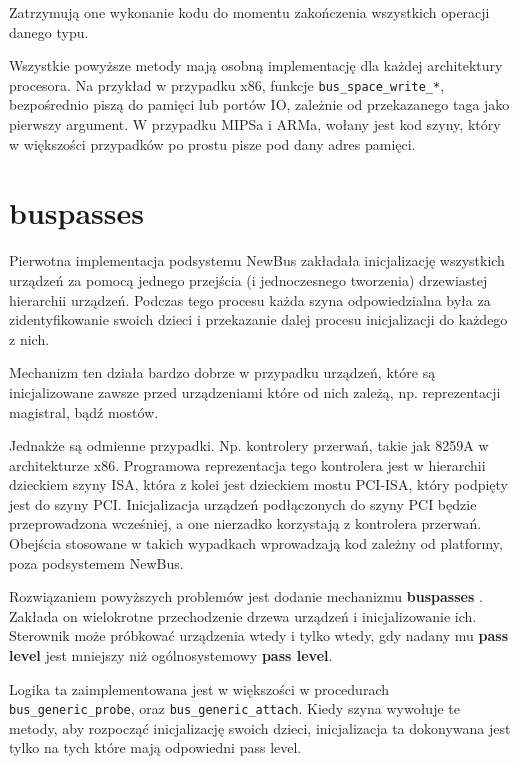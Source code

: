 \documentclass[shortabstract,inz]{iithesis}
\begin{document}
Zatrzymują one wykonanie kodu do momentu zakończenia wszystkich operacji danego typu. 

Wszystkie powyższe metody mają osobną implementację dla każdej architektury procesora. 
Na przykład w przypadku x86, funkcje \texttt{bus\_space\_write\_*}, bezpośrednio piszą do pamięci 
lub portów IO, zależnie od przekazanego taga jako pierwszy argument. W przypadku MIPSa i ARMa, 
wołany jest kod szyny, który w większości przypadków po prostu pisze pod dany adres pamięci.


\section{buspasses} %
\label{sec:buspasses}

Pierwotna implementacja podsystemu NewBus zakładała inicjalizację wszystkich
urządzeń za pomocą jednego przejścia (i jednoczesnego tworzenia) drzewiastej
hierarchii urządzeń. Podczas tego procesu każda szyna odpowiedzialna była
za zidentyfikowanie swoich dzieci i przekazanie dalej procesu inicjalizacji
do każdego z nich.

Mechanizm ten działa bardzo dobrze w przypadku urządzeń, które są inicjalizowane
zawsze przed urządzeniami które od nich zależą, np. reprezentacji magistral, bądź mostów.

Jednakże są odmienne przypadki.
Np. kontrolery przerwań, takie jak 8259A w architekturze x86.
Programowa reprezentacja tego kontrolera jest w hierarchii dzieckiem szyny ISA,
która z kolei jest dzieckiem mostu PCI-ISA, który podpięty jest do szyny PCI.
Inicjalizacja urządzeń podłączonych do szyny PCI będzie przeprowadzona wcześniej,
a one nierzadko korzystają z kontrolera przerwań.
Obejścia stosowane w takich wypadkach wprowadzają kod zależny od platformy,
poza podsystemem NewBus.


Rozwiązaniem powyższych problemów jest dodanie mechanizmu \textbf{buspasses} \cite{paper:buspasses}.
Zakłada on wielokrotne przechodzenie drzewa urządzeń i inicjalizowanie ich.
Sterownik może próbkować urządzenia wtedy i tylko wtedy, gdy nadany mu \textbf{pass level}
jest mniejszy niż ogólnosystemowy \textbf{pass level}.

Logika ta zaimplementowana jest w większości w procedurach \texttt{bus\_generic\_probe},
oraz \texttt{bus\_generic\_attach}.
Kiedy szyna wywołuje te metody, aby rozpocząć inicjalizację swoich dzieci, inicjalizacja
ta dokonywana jest tylko na tych które mają odpowiedni pass level.
\end{document}
